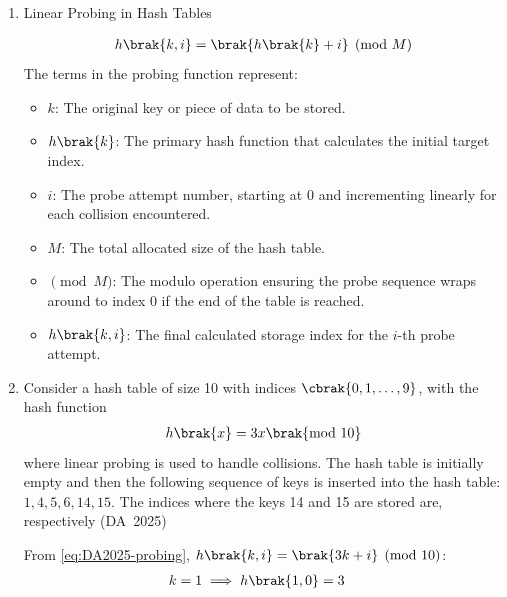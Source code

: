 \begin{enumerate}[label=\thesubsection.\arabic*, ref=\thesubsection.\theenumi]
	\item Linear Probing in Hash Tables
	
	\begin{align}
		h\brak{k, i} = \brak{h\brak{k} + i} \pmod M \label{eq:DA2025-probing}
	\end{align}
	The terms in the probing function represent:
	\begin{itemize}
		\item $k$: The original key or piece of data to be stored.
		\item $h\brak{k}$: The primary hash function that calculates the initial target index.
		\item $i$: The probe attempt number, starting at $0$ and incrementing linearly for each collision encountered.
		\item $M$: The total allocated size of the hash table.
		\item $\pmod M$: The modulo operation ensuring the probe sequence wraps around to index $0$ if the end of the table is reached.
		\item $h\brak{k, i}$: The final calculated storage index for the $i$-th probe attempt.
	\end{itemize}
	\item 
	Consider a hash table of size 10 with indices $\cbrak{0, 1, \dots, 9}$, with the hash function
	\begin{align}
		h\brak{x} = 3x \brak{\text{mod } 10}
	\end{align}
	where linear probing is used to handle collisions. The hash table is initially empty and then the following sequence of keys is inserted into the hash table: $1, 4, 5, 6, 14, 15$. The indices where the keys 14 and 15 are stored are, respectively
	\hfill (DA~2025)
	\begin{enumerate}
	\end{enumerate}
	\solution
	From \eqref{eq:DA2025-probing}, $h\brak{k, i} = \brak{3k + i} \pmod{10}$:
	\begin{align}
		k=1 &\implies h\brak{1, 0} = 3

\end{align}
\end{enumerate}
